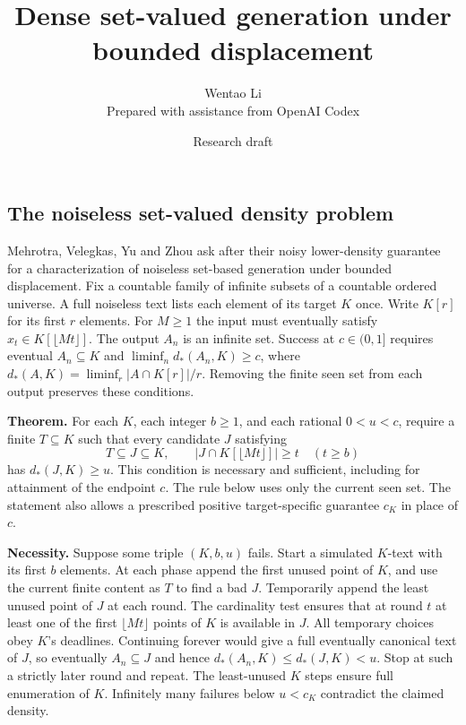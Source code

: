 \documentclass[11pt]{article}
\title{Dense set-valued generation under bounded displacement}
\author{Wentao Li\\{\small Prepared with assistance from OpenAI Codex}}
\date{Research draft}
\begin{document}
\maketitle
\subsection{The noiseless set-valued density problem}\label{the-noiseless-set-valued-density-problem}

Mehrotra, Velegkas, Yu and Zhou ask after their noisy lower-density guarantee for a characterization of noiseless set-based generation under bounded displacement. Fix a countable family of infinite subsets of a countable ordered universe. A full noiseless text lists each element of its target \(K\) once. Write \(K[r]\) for its first \(r\) elements. For \(M\ge1\) the input must eventually satisfy \(x_t\in K[\lfloor Mt\rfloor]\). The output \(A_n\) is an infinite set. Success at \(c\in(0,1]\) requires eventual \(A_n\subseteq K\) and \(\liminf_n d_*(A_n,K)\ge c\), where \(d_*(A,K)=\liminf_r |A\cap K[r]|/r\). Removing the finite seen set from each output preserves these conditions.

\textbf{Theorem.} For each \(K\), each integer \(b\ge1\), and each rational \(0<u<c\), require a finite \(T\subseteq K\) such that every candidate \(J\) satisfying
\[T\subseteq J\subseteq K,\qquad |J\cap K[\lfloor Mt\rfloor]|\ge t\quad(t\ge b)\]
has \(d_*(J,K)\ge u\). This condition is necessary and sufficient, including for attainment of the endpoint \(c\). The rule below uses only the current seen set. The statement also allows a prescribed positive target-specific guarantee \(c_K\) in place of \(c\).

\textbf{Necessity.} Suppose some triple \((K,b,u)\) fails. Start a simulated \(K\)-text with its first \(b\) elements. At each phase append the first unused point of \(K\), and use the current finite content as \(T\) to find a bad \(J\). Temporarily append the least unused point of \(J\) at each round. The cardinality test ensures that at round \(t\) at least one of the first \(\lfloor Mt\rfloor\) points of \(K\) is available in \(J\). All temporary choices obey \(K\)'s deadlines. Continuing forever would give a full eventually canonical text of \(J\), so eventually \(A_n\subseteq J\) and hence \(d_*(A_n,K)\le d_*(J,K)<u\). Stop at such a strictly later round and repeat. The least-unused \(K\) steps ensure full enumeration of \(K\). Infinitely many failures below \(u<c_K\) contradict the claimed density.
\end{document}
